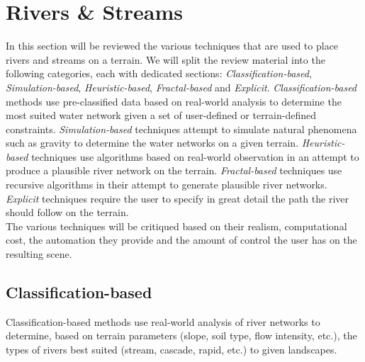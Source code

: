 \section{Rivers \& Streams}

In this section will be reviewed the various techniques that are used to place rivers and streams on a terrain. We will split the review material into the following categories, each with dedicated sections: \textit{Classification-based}, \textit{Simulation-based}, \textit{Heuristic-based}, \textit{Fractal-based} and \textit{Explicit}. \textit{Classification-based} methods use pre-classified data based on real-world analysis to determine the most suited water network given a set of user-defined or terrain-defined constraints. \textit{Simulation-based} techniques attempt to simulate natural phenomena such as gravity to determine the water networks on a given terrain. \textit{Heuristic-based} techniques use algorithms based on real-world observation in an attempt to produce a plausible river network on the terrain. \textit{Fractal-based} techniques use recursive algorithms in their attempt to generate plausible river networks. \textit{Explicit} techniques require the user to specify in great detail the path the river should follow on the terrain.\\

The various techniques will be critiqued based on their realism, computational cost, the automation they provide and the amount of control the user has on the resulting scene. 

\subsection{Classification-based}

Classification-based methods use real-world analysis of river networks to determine, based on terrain parameters (slope, soil type, flow intensity, etc.), the types of rivers best suited (stream, cascade, rapid, etc.) to given landscapes.\\

